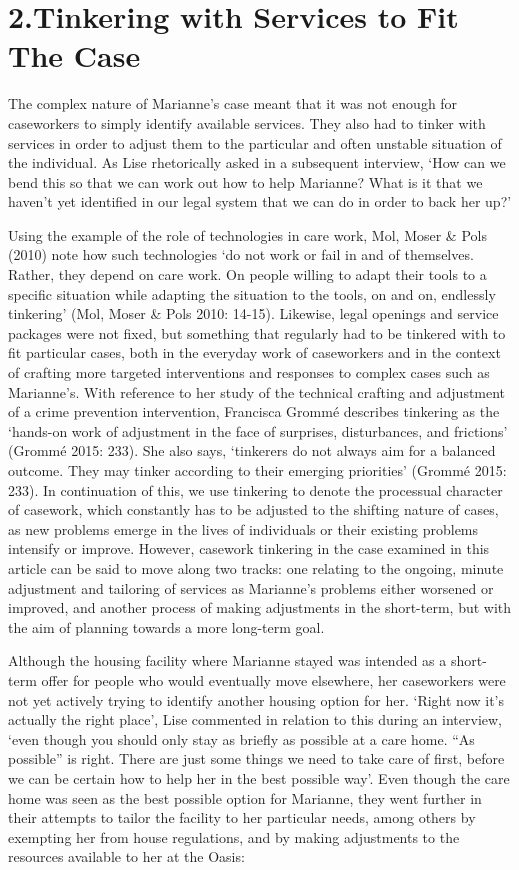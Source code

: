 \section{2.\hspace*{1em}Tinkering with Services to Fit The Case}
The complex nature of Marianne’s case meant that it was not enough for caseworkers to simply identify available services. They also had to tinker with services in order to adjust them to the particular and often unstable situation of the individual. As Lise rhetorically asked in a subsequent interview, ‘How can we bend this so that we can work out how to help Marianne? What is it that we haven’t yet identified in our legal system that we can do in order to back her up?’
\par
Using the example of the role of technologies in care work, Mol, Moser \& Pols (2010) note how such technologies ‘do not work or fail in and of themselves. Rather, they depend on care work. On people willing to adapt their tools to a specific situation while adapting the situation to the tools, on and on, endlessly tinkering’ (Mol, Moser \& Pols 2010: 14-15). Likewise, legal openings and service packages were not fixed, but something that regularly had to be tinkered with to fit particular cases, both in the everyday work of caseworkers and in the context of crafting more targeted interventions and responses to complex cases such as Marianne’s. With reference to her study of the technical crafting and adjustment of a crime prevention intervention, Francisca Grommé describes tinkering as the ‘hands-on work of adjustment in the face of surprises, disturbances, and frictions’ (Grommé 2015: 233). She also says, ‘tinkerers do not always aim for a balanced outcome. They may tinker according to their emerging priorities’ (Grommé 2015: 233). In continuation of this, we use tinkering to denote the processual character of casework, which constantly has to be adjusted to the shifting nature of cases, as new problems emerge in the lives of individuals or their existing problems intensify or improve. However, casework tinkering in the case examined in this article can be said to move along two tracks: one relating to the ongoing, minute adjustment and tailoring of services as Marianne’s problems either worsened or improved, and another process of making adjustments in the short-term, but with the aim of planning towards a more long-term goal.
\par
Although the housing facility where Marianne stayed was intended as a short-term offer for people who would eventually move elsewhere, her caseworkers were not yet actively trying to identify another housing option for her. ‘Right now it’s actually the right place’, Lise commented in relation to this during an interview, ‘even though you should only stay as briefly as possible at a care home. “As possible” is right. There are just some things we need to take care of first, before we can be certain how to help her in the best possible way’. Even though the care home was seen as the best possible option for Marianne, they went further in their attempts to tailor the facility to her particular needs, among others by exempting her from house regulations, and by making adjustments to the resources available to her at the Oasis:
